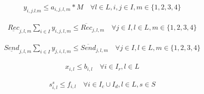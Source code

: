 \documentclass{article}
\begin{document}
\begin{align*}
        y_{i,j.l.m} \le a_{i,j,l,m} * M \quad \forall l \in L, i,j \in I, m \in \{1,2,3,4\}
\end{align*}

\begin{align*}
        \underline{Rec}_{j,l,m} \sum_{i \in I} y_{i,j,l,m} \le \overline{Rec}_{j,l,m} \quad \forall j \in I, l \in L, m \in \{1,2,3,4\}
\end{align*}

\begin{align*}
        \underline{Send}_{j,l,m} \sum_{i \in I} y_{j,i,l,m} \le \overline{Send}_{j,l,m} \quad \forall j \in I, l \in L, m \in \{1,2,3,4\}
\end{align*}

\begin{align*}
        x_{i,l} \le b_{i,l} \quad \forall i \in I_r, l \in L
\end{align*}

\begin{align*}
        s_{i,l}^s \le f_{i,l} \quad \forall i \in I_c \cup I_d, l \in L, s \in S
\end{align*}

\end{document}

